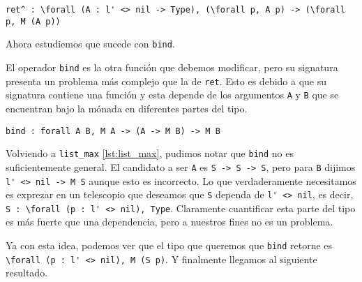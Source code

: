 \begin{lstlisting}[float=h,frame=tb,caption={Signatura deseada de \lstinline{ret}},label=lst:ret_motiv]
ret^ : \forall (A : l' <> nil -> Type), (\forall p, A p) -> (\forall p, M (A p))
\end{lstlisting}



Ahora estudiemos que sucede con \lstinline{bind}.

El operador \lstinline{bind} es la otra función que debemos modificar, pero su signatura presenta un problema más complejo que la de \lstinline{ret}. Esto es debido a que su signatura contiene una función y esta depende de los argumentos \lstinline{A} y \lstinline{B} que se encuentran bajo la mónada en diferentes partes del tipo.

\begin{lstlisting}[float=h,frame=tb,caption={Signatura de bind},label=lst:bind]
bind : forall A B, M A -> (A -> M B) -> M B
\end{lstlisting}

Volviendo a \lstinline{list_max} \ref{lst:list_max}, pudimos notar que \lstinline{bind} no es suficientemente general. El candidato a ser \lstinline{A} es \lstinline{S -> S -> S}, pero para \lstinline{B} dijimos \lstinline{l' <> nil -> M S} aunque esto es incorrecto.
Lo que verdaderamente necesitamos es exprezar en un telescopio que deseamos que \texttt{S} dependa de \lstinline{l' <> nil}, es decir, \lstinline{S : \forall (p : l' <> nil), Type}.
Claramente cuantificar esta parte del tipo es más fuerte que una dependencia, pero a nuestros fines no es un problema.

Ya con esta idea, podemos ver que el tipo que queremos que \lstinline{bind} retorne es \lstinline{\forall (p : l' <> nil), M (S p)}. Y finalmente llegamos al siguiente resultado.

